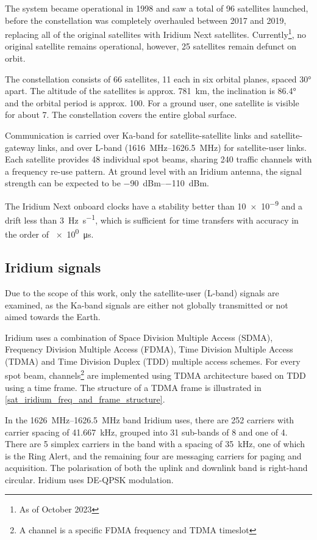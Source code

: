 The system became operational in 1998 and saw a total of 96 satellites launched, before the constellation was completely overhauled between 2017 and 2019, replacing all of the original satellites with Iridium Next satellites. Currently\footnote{As of October 2023}, no original satellite remains operational, however, 25 satellites remain defunct on orbit\cite{sat06}.

The constellation consists of 66 satellites, 11 each in six orbital planes, spaced \ang{30} apart. The altitude of the satellites is approx. \qty{781}{\km}, the inclination is \ang{86.4} and the orbital period is approx. \qty{100}{\min}. For a ground user, one satellite is visible for about \qty{7}{\min}. The constellation covers the entire global surface\cite{sat01}.

Communication is carried over Ka-band for satellite-satellite links and satellite-gateway links, and over L-band (\qtyrange{1616}{1626.5}{\mega\hertz}) for satellite-user links. Each satellite provides 48 individual spot beams, sharing 240 traffic channels with a frequency re-use pattern\cite{sat07}. At ground level with an Iridium antenna, the signal strength can be expected to be \qtyrange{-90}{-110}{dBm}\cite{sop01}.

The Iridium Next onboard clocks have a stability better than \num{10e-9} and a drift less than \qty{3}{\hertz\per\s}, which is sufficient for time transfers with accuracy in the order of \qty{e0}{\micro\s}\cite{sop11}.

\subsection{Iridium signals}
Due to the scope of this work, only the satellite-user (L-band) signals are examined, as the Ka-band signals are either not globally transmitted or not aimed towards the Earth.

Iridium uses a combination of Space Division Multiple Access (SDMA),  Frequency Division Multiple Access (FDMA), Time Division Multiple Access (TDMA) and Time Division Duplex (TDD) multiple access schemes\cite{sop11}. For every spot beam, channels\footnote{A channel is a specific FDMA frequency and TDMA timeslot\cite{sat07}} are implemented using TDMA architecture based on TDD using a time frame\cite{sop12}. The structure of a TDMA frame is illustrated in \ref{sat_iridium_freq_and_frame_structure}.

In the \qtyrange{1626}{1626.5}{\MHz} band Iridium uses, there are 252 carriers with carrier spacing of \qty{41.667}{\kHz}, grouped into 31 sub-bands of 8 and one of 4. There are 5 simplex carriers in the band with a spacing of \qty{35}{\kHz}, one of which is the Ring Alert, and the remaining four are messaging carriers for paging and acquisition. The polarisation of both the uplink and downlink band is right-hand circular. Iridium uses DE-QPSK modulation\cite{sat04}.

